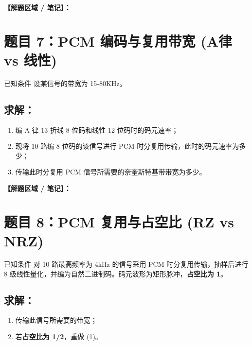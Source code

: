 \documentclass[12pt, a4paper]{article}
\begin{document}
	\noindent\textbf{【解题区域 / 笔记】：}
	
	\newpage
	
	\section*{题目 7：PCM 编码与复用带宽 (A律 vs 线性)}
	
	\begin{problembox}{已知条件}
		设某信号的带宽为 15-80KHz。
	\end{problembox}
	
	\subsection*{求解：}
	\begin{enumerate}[label=(\arabic*)]
		\item 编 A 律 13 折线 8 位码和线性 12 位码时的码元速率；
		\item 现将 10 路编 8 位码的该信号进行 PCM 时分复用传输，此时的码元速率为多少；
		\item 传输此时分复用 PCM 信号所需要的奈奎斯特基带带宽为多少。
	\end{enumerate}
	
	\noindent\textbf{【解题区域 / 笔记】：}
	
	\newpage
	
	\section*{题目 8：PCM 复用与占空比 (RZ vs NRZ)}
	
	\begin{problembox}{已知条件}
		对 10 路最高频率为 4kHz 的信号采用 PCM 时分复用传输，抽样后进行 8 级线性量化，并编为自然二进制码。码元波形为矩形脉冲，\textbf{占空比为 1}。
	\end{problembox}
	
	\subsection*{求解：}
	\begin{enumerate}[label=(\arabic*)]
		\item 传输此信号所需要的带宽；
		\item 若\textbf{占空比为 1/2}，重做 (1)。
	\end{enumerate}
	
\end{document}
